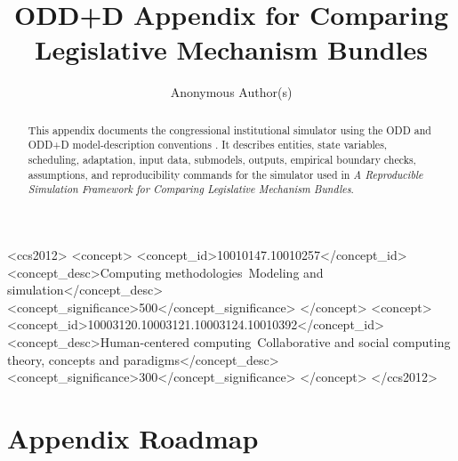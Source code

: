 \documentclass[manuscript]{acmart}
\begin{document}
\title{ODD+D Appendix for Comparing Legislative Mechanism Bundles}

\author{Anonymous Author(s)}
\renewcommand{\shortauthors}{Anonymous Author(s)}
\authorsaddresses{}

\begin{abstract}
This appendix documents the congressional institutional simulator using the ODD and ODD+D model-description conventions \citep{Grimm2010,Muller2013}. It describes entities, state variables, scheduling, adaptation, input data, submodels, outputs, empirical boundary checks, assumptions, and reproducibility commands for the simulator used in \emph{A Reproducible Simulation Framework for Comparing Legislative Mechanism Bundles}.
\end{abstract}

\begin{CCSXML}
<ccs2012>
<concept>
<concept_id>10010147.10010257</concept_id>
<concept_desc>Computing methodologies~Modeling and simulation</concept_desc>
<concept_significance>500</concept_significance>
</concept>
<concept>
<concept_id>10003120.10003121.10003124.10010392</concept_id>
<concept_desc>Human-centered computing~Collaborative and social computing theory, concepts and paradigms</concept_desc>
<concept_significance>300</concept_significance>
</concept>
</ccs2012>
\end{CCSXML}



\maketitle

\section{Appendix Roadmap}
\end{document}
